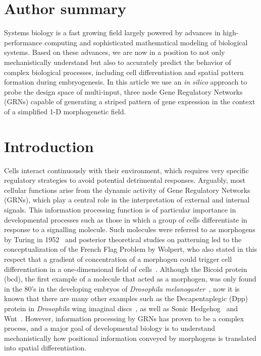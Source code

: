 \documentclass[10pt,letterpaper]{article}
\begin{document}

\section*{Author summary}
Systems biology is a fast growing field largely powered by advances in
high-performance computing and sophisticated mathematical modeling of
biological systems. Based on these advances, we are now in a position to not
only mechanistically understand but also to accurately predict the behavior of
complex biological processes, including cell differentiation and spatial pattern
formation during embryogenesis. In this article we use an \textit{in silico}
approach to probe the design space of multi-input, three node Gene Regulatory
Networks (GRNs) capable of generating a striped pattern of gene expression in
the context of a simplified 1-D morphogenetic field.

\linenumbers

\section*{Introduction}

Cells interact continuously with their environment, which requires very specific
regulatory strategies to avoid potential detrimental responses. Arguably, most
cellular functions arise from the dynamic activity of Gene Regulatory Networks
(GRNs), which play a central role in the interpretation of external and internal
signals. This information
processing function is of particular importance in developmental processes such
as those in which a group of cells differentiate in response to a signalling
molecule. Such molecules were referred to as morphogens by Turing in
1952~\cite{Turing1952} and posterior theoretical studies on patterning led to the
conceptualization of the French Flag Problem by Wolpert, who also stated
in this respect that a gradient of concentration of a morphogen could
trigger cell differentiation in a one-dimensional field of cells~\cite{Wolpert1969,
sharpe_2019}.
Although the Bicoid protein (bcd), the first example of a molecule that acted
as a morphogen, was only found in the 80's in the developing embryos of
\textit{Drosophila melanogaster}~\cite{driever_gradient_1988,
driever_bicoid_1988}, now it is known that there
are many other examples such as the Decapentaplegic (Dpp) protein in
\textit{Drosophila} wing imaginal discs~\cite{affolter_decapentaplegic_2007},
as well as Sonic Hedgehog~\cite{dessaud_dynamic_2010,cohen_theoretical_2014}
and Wnt~\cite{raspopovic_digit_2014}. However, information processing by GRNs
has proven to be a complex process, and a major goal of developmental biology
is to understand mechanistically how positional information conveyed by morphogens
is translated into spatial differentiation.\\
\end{document}
